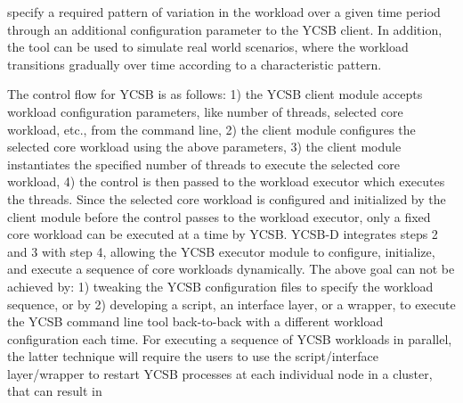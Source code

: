 \documentclass{vldb}
\begin{document}
              specify a required pattern of variation in the workload over a given time period
              through an additional configuration parameter to the YCSB client. In addition, the tool can be used to
               simulate real world scenarios, where the workload transitions gradually over
               time according to a characteristic pattern.
               \par %
                The control flow for YCSB is as follows: 1) the YCSB client module accepts workload configuration parameters, like number of 
                threads, selected core workload, etc., from the command line, 2) the client module configures the selected core workload 
                using the above parameters,  3) the client module instantiates the specified number of threads to execute 
                the selected core workload, 4) the control is then passed to the workload executor which
                 executes the threads. 
                Since the selected core workload is configured and initialized by the client module before the 
                control passes to the workload executor, only a fixed core workload can be executed at 
                a time by YCSB.
                 YCSB-D integrates steps 2 and 3 with step 4, allowing the 
                 YCSB executor module to configure, initialize, and execute a sequence of core workloads dynamically. 
                 The above goal can not be achieved by: 1) tweaking the YCSB configuration files 
                to specify the workload sequence, or by 2) developing a script, an interface layer, or a wrapper, to 
                 execute the YCSB command line tool back-to-back with a different workload configuration each time. For
                 executing a sequence of YCSB workloads in parallel, the latter technique will require the users to
                 use the script/interface layer/wrapper to restart YCSB processes at each individual node in a cluster, that can result in
\end{document}
